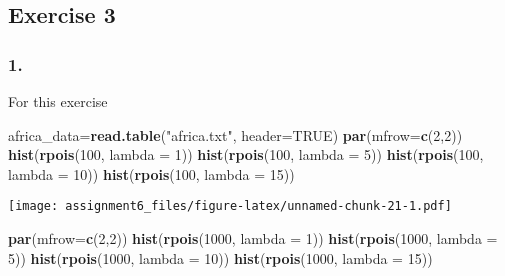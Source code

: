 \documentclass[11pt,]{article}
\newenvironment{Shaded}{\begin{snugshade}}{\end{snugshade}}
\newcommand{\KeywordTok}[1]{\textcolor[rgb]{0.13,0.29,0.53}{\textbf{{#1}}}}
\newcommand{\DataTypeTok}[1]{\textcolor[rgb]{0.13,0.29,0.53}{{#1}}}
\newcommand{\DecValTok}[1]{\textcolor[rgb]{0.00,0.00,0.81}{{#1}}}
\newcommand{\StringTok}[1]{\textcolor[rgb]{0.31,0.60,0.02}{{#1}}}
\newcommand{\OtherTok}[1]{\textcolor[rgb]{0.56,0.35,0.01}{{#1}}}
\newcommand{\NormalTok}[1]{{#1}}
\begin{document}
\subsection{Exercise 3}\label{exercise-3}

\subsubsection{1.}\label{section-15}

For this exercise

\begin{Shaded}
\begin{Highlighting}[]
\NormalTok{africa_data=}\KeywordTok{read.table}\NormalTok{(}\StringTok{"africa.txt"}\NormalTok{, }\DataTypeTok{header=}\OtherTok{TRUE}\NormalTok{)}
\KeywordTok{par}\NormalTok{(}\DataTypeTok{mfrow=}\KeywordTok{c}\NormalTok{(}\DecValTok{2}\NormalTok{,}\DecValTok{2}\NormalTok{))}
\KeywordTok{hist}\NormalTok{(}\KeywordTok{rpois}\NormalTok{(}\DecValTok{100}\NormalTok{, }\DataTypeTok{lambda =} \DecValTok{1}\NormalTok{))}
\KeywordTok{hist}\NormalTok{(}\KeywordTok{rpois}\NormalTok{(}\DecValTok{100}\NormalTok{, }\DataTypeTok{lambda =} \DecValTok{5}\NormalTok{))}
\KeywordTok{hist}\NormalTok{(}\KeywordTok{rpois}\NormalTok{(}\DecValTok{100}\NormalTok{, }\DataTypeTok{lambda =} \DecValTok{10}\NormalTok{))}
\KeywordTok{hist}\NormalTok{(}\KeywordTok{rpois}\NormalTok{(}\DecValTok{100}\NormalTok{, }\DataTypeTok{lambda =} \DecValTok{15}\NormalTok{))}
\end{Highlighting}
\end{Shaded}

\texttt{[image: assignment6\_files/figure-latex/unnamed-chunk-21-1.pdf]}

\begin{Shaded}
\begin{Highlighting}[]
\KeywordTok{par}\NormalTok{(}\DataTypeTok{mfrow=}\KeywordTok{c}\NormalTok{(}\DecValTok{2}\NormalTok{,}\DecValTok{2}\NormalTok{))}
\KeywordTok{hist}\NormalTok{(}\KeywordTok{rpois}\NormalTok{(}\DecValTok{1000}\NormalTok{, }\DataTypeTok{lambda =} \DecValTok{1}\NormalTok{))}
\KeywordTok{hist}\NormalTok{(}\KeywordTok{rpois}\NormalTok{(}\DecValTok{1000}\NormalTok{, }\DataTypeTok{lambda =} \DecValTok{5}\NormalTok{))}
\KeywordTok{hist}\NormalTok{(}\KeywordTok{rpois}\NormalTok{(}\DecValTok{1000}\NormalTok{, }\DataTypeTok{lambda =} \DecValTok{10}\NormalTok{))}
\KeywordTok{hist}\NormalTok{(}\KeywordTok{rpois}\NormalTok{(}\DecValTok{1000}\NormalTok{, }\DataTypeTok{lambda =} \DecValTok{15}\NormalTok{))}
\end{Highlighting}
\end{Shaded}
\end{document}
